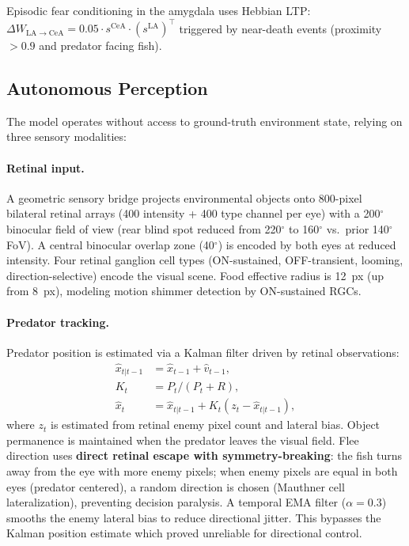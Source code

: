 \documentclass[9pt]{elife}
\begin{document}
Episodic fear conditioning in the amygdala uses Hebbian LTP:
$\Delta W_{\mathrm{LA} \to \mathrm{CeA}} = 0.05 \cdot s^{\mathrm{CeA}} \cdot (s^{\mathrm{LA}})^\top$
triggered by near-death events (proximity $> 0.9$ and predator facing fish).

\subsection{Autonomous Perception}

The model operates without access to ground-truth environment state,
relying on three sensory modalities:

\paragraph{Retinal input.}
A geometric sensory bridge projects environmental objects onto 800-pixel
bilateral retinal arrays (400 intensity + 400 type channel per eye)
with a 200$^\circ$ binocular field of view (rear blind spot reduced
from 220$^\circ$ to 160$^\circ$ vs.\ prior 140$^\circ$ FoV).
A central binocular overlap zone (40$^\circ$) is encoded by both eyes
at reduced intensity.
Four retinal ganglion cell types (ON-sustained, OFF-transient, looming,
direction-selective) encode the visual scene.
Food effective radius is 12~px (up from 8~px), modeling motion shimmer
detection by ON-sustained RGCs.

\paragraph{Predator tracking.}
Predator position is estimated via a Kalman filter driven by retinal observations:
\begin{align}
\hat{x}_{t|t-1} &= \hat{x}_{t-1} + \hat{v}_{t-1}, \\
K_t &= P_t / (P_t + R), \\
\hat{x}_t &= \hat{x}_{t|t-1} + K_t (z_t - \hat{x}_{t|t-1}),
\end{align}
where $z_t$ is estimated from retinal enemy pixel count and lateral bias.
Object permanence is maintained when the predator leaves the visual field.
Flee direction uses \textbf{direct retinal escape with symmetry-breaking}:
the fish turns away from the eye with more enemy pixels; when enemy pixels
are equal in both eyes (predator centered), a random direction is chosen
(Mauthner cell lateralization), preventing decision paralysis.
A temporal EMA filter ($\alpha=0.3$) smooths the enemy lateral bias
to reduce directional jitter.
This bypasses the Kalman position estimate which proved unreliable
for directional control.
\end{document}
